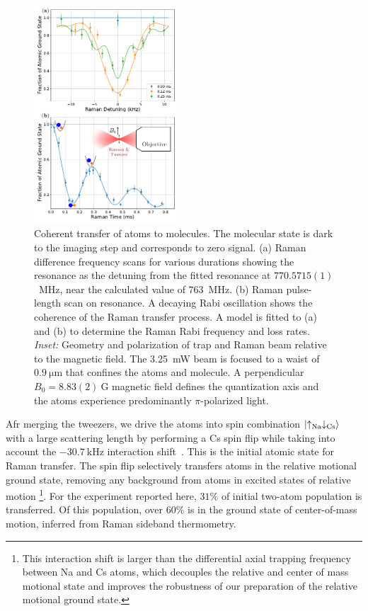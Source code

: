 \documentclass[aps,prl,twocolumn,10pt,superscriptaddress]{revtex4-1}
\newcommand{\Na}{\mathrm{Na}}
\newcommand{\Cs}{\mathrm{Cs}}
\begin{document}
\begin{figure}[t!]
  \includegraphics[width=0.48\textwidth]{imgs/fig-raman.pdf}
  \caption{Coherent transfer of atoms to molecules.  The molecular state is dark to the imaging step and corresponds to zero signal.
    (a) Raman difference frequency scans for various durations
    showing the resonance as the detuning from
    the fitted resonance at $770.5715(1)$~MHz, near the calculated value of $763$~MHz.
    (b) Raman pulse-length scan on resonance.
    A decaying Rabi oscillation shows the coherence of
    the Raman transfer process.
    A model is fitted to (a) and (b) to determine
    the Raman Rabi frequency and loss rates.
    \emph{Inset:} Geometry and polarization of trap and Raman beam relative to the magnetic field.
    The 3.25~mW beam is focused to a waist of $0.9~\mathrm{\mu m}$
    that confines the atoms and molecule.
    A perpendicular $B_0=8.83(2)~\mathrm{G}$ magnetic field
    defines the quantization axis and the atoms experience predominantly $\pi$-polarized light.
    \label{f-raman}}
\end{figure}
Afr merging the tweezers, we drive the atoms into spin combination $\ket{\uparrow_{\Na} \downarrow_{\Cs}}$ with a large scattering length
by performing a Cs spin flip while taking into account
the $-30.7~\mathrm{kHz}$ interaction shift~\cite{Hood2019}.
This is the initial atomic state for Raman transfer.
The spin flip selectively transfers atoms in the relative motional ground state,
removing any background from atoms in excited states of relative motion
\footnote{This interaction shift is larger than the differential axial trapping frequency
  between Na and Cs atoms, which decouples the relative and center of mass motional state
  and improves the robustness of our preparation of the relative motional ground state.}.
For the experiment reported here,
$31\mathrm{\%}$ of initial two-atom population is transferred. Of this population, over $60\%$ is in the ground state of center-of-mass motion, inferred from Raman sideband thermometry.
\end{document}
